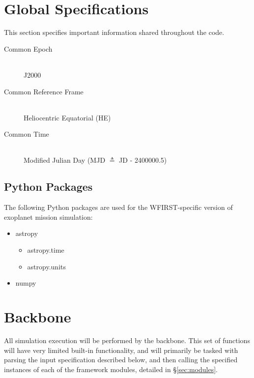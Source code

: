 \documentclass[]{asme2ej}
\begin{document}

\section{Global Specifications}
This section specifies important information shared throughout the code.
\begin{description}
    \item[Common Epoch] \hfill \\ J2000
    \item[Common Reference Frame] \hfill \\ Heliocentric Equatorial (HE)
    \item[Common Time] \hfill \\ Modified Julian Day (MJD $\triangleq$ JD - 2400000.5)
\end{description}

\subsection{Python Packages}
The following Python packages are used for the WFIRST-specific version of exoplanet mission simulation:

\begin{itemize}
    \item astropy
        \begin{itemize}
            \item astropy.time
            \item astropy.units
        \end{itemize}
    \item numpy 
\end{itemize}


\section{Backbone}
All simulation execution will be performed by the backbone.  This set of functions will have very limited built-in functionality, and will primarily be tasked with parsing the input specification described below, and then calling the specified instances of each of the framework modules, detailed in \S\ref{sec:modules}.
\end{document}
